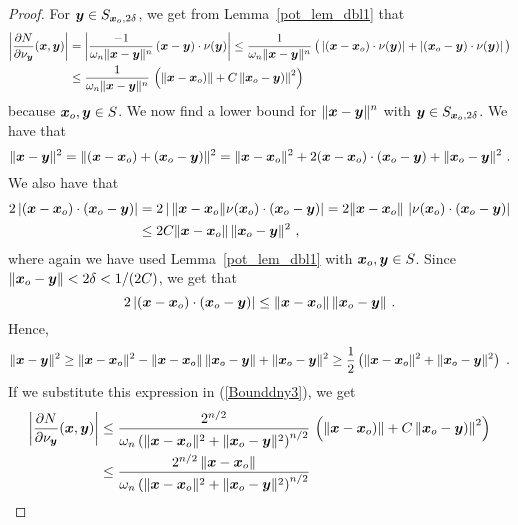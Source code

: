 \begin{proof}
For ${\bm{y}} \in S_{{\bm{x}}_o,2\delta}$, we get from
Lemma~\ref{pot_lem_dbl1} that
\begin{align}
\left| \frac{\partial{N}}{\partial \nu_{{\bm{y}}}}({\bm{x}},{\bm{y}})\right| 
&= \left| \frac{-1}{\omega_n \|{\bm{x}}-{\bm{y}}\|^n}\,({\bm{x}}-{\bm{y}})
\cdot \nu({\bm{y}}) \right|
\leq \frac{1}{\omega_n \|{\bm{x}}-{\bm{y}}\|^n}\,\big(
\left|({\bm{x}}-{\bm{x}}_o) \cdot \nu({\bm{y}}) \right|
+ \left| ({\bm{x}}_o-{\bm{y}}) \cdot \nu({\bm{y}}) \right| \big)
\nonumber \\
&\leq \frac{1}{\omega_n \|{\bm{x}}-{\bm{y}}\|^n}\,\left(
\left\|{\bm{x}}-{\bm{x}}_o) \right\|
+ C \left\| {\bm{x}}_o-{\bm{y}}) \right\|^2 \right)
\label{Bounddny3}
\end{align}
because ${\bm{x}}_o, {\bm{y}} \in S$.  We now find a lower bound for
$\displaystyle \|{\bm{x}}-{\bm{y}}\|^n$ with ${\bm{y}} \in S_{{\bm{x}}_o,2\delta}$.
We have that
\[
\|{\bm{x}}-{\bm{y}}\|^2 = \| ({\bm{x}}-{\bm{x}}_o) + ({\bm{x}}_o-{\bm{y}})\|^2
= \|{\bm{x}}-{\bm{x}}_o\|^2 + 2 ({\bm{x}}-{\bm{x}}_o) \cdot ({\bm{x}}_o-{\bm{y}})
+ \|{\bm{x}}_o-{\bm{y}}\|^2 \ .
\]
We also have that
\begin{align*}
2\left| ({\bm{x}} - {\bm{x}}_o) \cdot ({\bm{x}}_o - {\bm{y}}) \right|
&= 2\left|\, \|{\bm{x}} - {\bm{x}}_o\| \nu({\bm{x}}_o)
\cdot ({\bm{x}}_o - {\bm{y}}) \right|
= 2\|{\bm{x}} - {\bm{x}}_o\|\, \left|\nu({\bm{x}}_o)
\cdot ({\bm{x}}_o - {\bm{y}}) \right| \\
&\leq 2 C \|{\bm{x}} - {\bm{x}}_o\| \, \|{\bm{x}}_o - {\bm{y}}\|^2 \ ,
\end{align*}
where again we have used Lemma~\ref{pot_lem_dbl1} with
${\bm{x}}_o, {\bm{y}} \in S$.  Since
$\|{\bm{x}}_o - {\bm{y}}\| < 2\delta < 1/(2C)$, we get that
\[
2\left| ({\bm{x}} - {\bm{x}}_o) \cdot ({\bm{x}}_o - {\bm{y}}) \right|
\leq \|{\bm{x}} - {\bm{x}}_o\| \, \|{\bm{x}}_o - {\bm{y}}\| \ .
\]
Hence,
\[
\|{\bm{x}}-{\bm{y}}\|^2 \geq \|{\bm{x}}-{\bm{x}}_o\|^2
- \|{\bm{x}} - {\bm{x}}_o\| \, \|{\bm{x}}_o - {\bm{y}}\| + \|{\bm{x}}_o-{\bm{y}}\|^2
\geq \frac{1}{2} \left( \|{\bm{x}}-{\bm{x}}_o\|^2
+ \|{\bm{x}}_o-{\bm{y}}\|^2 \right) \ .
\]
If we substitute this expression in (\ref{Bounddny3}), we get
\begin{align*}
\left| \pdydx{N}{\nu_{\VEC{y}}}(\VEC{x},\VEC{y})\right| 
&\leq \frac{2^{n/2}}{\omega_n \left(\|\VEC{x}-\VEC{x}_o\|^2 +
    \|\VEC{x}_o-\VEC{y}\|^2\right)^{n/2}}\,\left(
\left\|\VEC{x}-\VEC{x}_o) \right\|
  + C \left\| \VEC{x}_o-\VEC{y}) \right\|^2 \right) \\
&\leq \frac{2^{n/2} \left\|\VEC{x}-\VEC{x}_o\right\|}
{\omega_n \left(\|\VEC{x}-\VEC{x}_o\|^2 +
\|\VEC{x}_o-\VEC{y}\|^2\right)^{n/2}}

\end{align*}
\end{proof}
